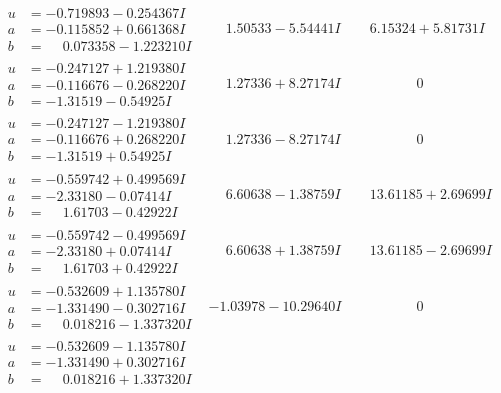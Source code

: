 \documentclass[1p]{elsarticle_modified}
\theoremstyle{definition}
\begin{document}
$$\begin{array}{c|c|c}
\begin{aligned}
u &= -0.719893 - 0.254367 I \\
a &= -0.115852 + 0.661368 I \\
b &= \phantom{-}0.073358 - 1.223210 I\end{aligned}
 & \phantom{-}1.50533 - 5.54441 I & \phantom{-}6.15324 + 5.81731 I \\ \hline\begin{aligned}
u &= -0.247127 + 1.219380 I \\
a &= -0.116676 - 0.268220 I \\
b &= -1.31519 - 0.54925 I\end{aligned}
 & \phantom{-}1.27336 + 8.27174 I & \phantom{-0.000000 } 0 \\ \hline\begin{aligned}
u &= -0.247127 - 1.219380 I \\
a &= -0.116676 + 0.268220 I \\
b &= -1.31519 + 0.54925 I\end{aligned}
 & \phantom{-}1.27336 - 8.27174 I & \phantom{-0.000000 } 0 \\ \hline\begin{aligned}
u &= -0.559742 + 0.499569 I \\
a &= -2.33180 - 0.07414 I \\
b &= \phantom{-}1.61703 - 0.42922 I\end{aligned}
 & \phantom{-}6.60638 - 1.38759 I & \phantom{-}13.61185 + 2.69699 I \\ \hline\begin{aligned}
u &= -0.559742 - 0.499569 I \\
a &= -2.33180 + 0.07414 I \\
b &= \phantom{-}1.61703 + 0.42922 I\end{aligned}
 & \phantom{-}6.60638 + 1.38759 I & \phantom{-}13.61185 - 2.69699 I \\ \hline\begin{aligned}
u &= -0.532609 + 1.135780 I \\
a &= -1.331490 - 0.302716 I \\
b &= \phantom{-}0.018216 - 1.337320 I\end{aligned}
 & -1.03978 - 10.29640 I & \phantom{-0.000000 } 0 \\ \hline\begin{aligned}
u &= -0.532609 - 1.135780 I \\
a &= -1.331490 + 0.302716 I \\
b &= \phantom{-}0.018216 + 1.337320 I\end{aligned}

\end{array}$$
\end{document}
